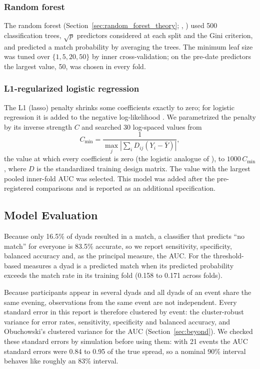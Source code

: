 \subsubsection{Random forest}
The random forest (Section~\ref{sec:random_forest_theory}; \cite{Breiman:2001}, \cite[Algorithm 15.1, p.~588]{Hastie:2009})
used 500 classification trees,
$\sqrt p$ predictors considered at each split and the Gini criterion, and predicted a match probability by averaging
the trees. The minimum leaf size was tuned over $\{1,5,20,50\}$ by inner cross-validation; on the pre-date predictors
the largest value, 50, was chosen in every fold.

\subsubsection{L1-regularized logistic regression}
The L1 (lasso) penalty \cite[Section 6.2.2, pp.~244--252]{James:2023} shrinks some coefficients exactly to zero; for
logistic regression it is added to the negative log-likelihood \cite[Section 4.4.4, Eq.~(4.31), p.~125]{Hastie:2009}.
We parametrized the penalty by its inverse strength $C$ and searched 30 log-spaced values from
\[
C_{\min}=\frac{1}{\max_j\left|\sum_i D_{ij}(Y_i-\bar Y)\right|},
\]
the value at which every coefficient is zero (the logistic analogue of \cite[Section 2.5, p.~7]{Friedman:2010}),
to $1000\,C_{\min}$, where $D$ is the standardized training design matrix. The value with the largest pooled inner-fold
AUC was selected. This model was added after the pre-registered comparisons and is reported as an additional
specification.

\subsection{Model Evaluation}

Because only 16.5\% of dyads resulted in a match, a classifier that predicts ``no match'' for everyone is 83.5\%
accurate, so we report sensitivity, specificity, balanced accuracy and, as the principal measure, the AUC. For the
threshold-based measures a dyad is a predicted match when its predicted probability exceeds the match rate in its
training fold (0.158 to 0.171 across folds).

Because participants appear in several dyads and all dyads of an event share the same evening, observations from the
same event are not independent. Every standard error in this report is therefore clustered by event: the
cluster-robust variance for error rates, sensitivity, specificity and balanced accuracy, and Obuchowski's clustered
variance for the AUC (Section~\ref{sec:beyond}). We checked these standard errors by simulation before using them:
with 21 events the AUC standard errors were 0.84 to 0.95 of the true spread, so a nominal 90\% interval behaves like
roughly an 83\% interval.
